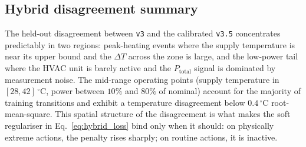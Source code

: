 \subsection{Hybrid disagreement summary}
\label{ssec:res1_disagreement}

The held-out disagreement between \texttt{v3} and the calibrated
\texttt{v3.5} concentrates predictably in two regions: peak-heating
events where the supply temperature is near its upper bound and the
$\Delta T$ across the zone is large, and the low-power tail where the
HVAC unit is barely active and the $P_{\mathrm{total}}$ signal is
dominated by measurement noise. The mid-range operating points
(supply temperature in $[28, 42]\,^{\circ}\mathrm{C}$, power between
$10\%$ and $80\%$ of nominal) account for the majority of training
transitions and exhibit a temperature disagreement below
$0.4\,^{\circ}\mathrm{C}$ root-mean-square. This spatial structure of
the disagreement is what makes the soft regulariser in
Eq.~\eqref{eq:hybrid_loss} bind only when it should: on physically
extreme actions, the penalty rises sharply; on routine actions, it is
inactive.
